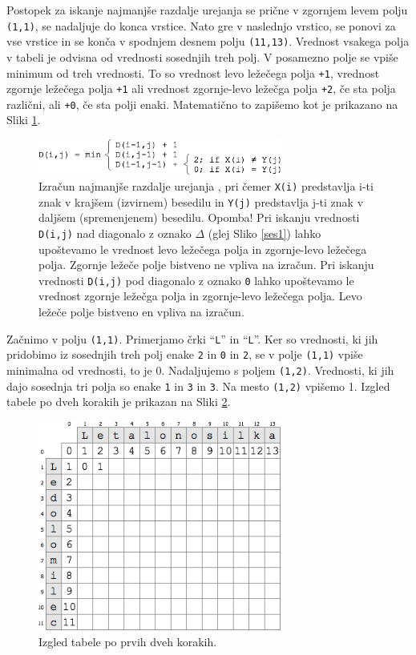 \documentclass[a4paper, 12pt, twoside]{book}
\begin{document}
Postopek za iskanje najmanjše razdalje urejanja se prične v zgornjem levem polju {\tt (1,1)}, se nadaljuje do konca vrstice. Nato gre v naslednjo vrstico, se ponovi za vse vrstice in se konča v spodnjem desnem polju {\tt (11,13)}. Vrednost vsakega polja v tabeli je odvisna od vrednosti sosednjih treh polj. V posamezno polje se vpiše minimum od treh vrednosti. To so vrednost levo ležečega polja {\tt +1}, vrednost zgornje ležečega polja {\tt +1} ali vrednost zgornje-levo ležečga polja {\tt +2}, če sta polja različni, ali {\tt +0}, če sta polji enaki. Matematično to zapišemo kot je prikazano na Sliki \ref{med2}.

\begin{figure}[placement h]
\begin{center}
\includegraphics[width=8cm]{med2.png}
\end{center}
\caption{Izračun najmanjše razdalje urejanja \cite{med}, pri čemer {\tt X(i)} predstavlja i-ti znak v krajšem (izvirnem) besedilu in {\tt Y(j)} predstavlja j-ti znak v daljšem (spremenjenem) besedilu. Opomba! Pri iskanju vrednosti {\tt D(i,j)} nad diagonalo z oznako {\tt $\Delta$} (glej Sliko \ref{ses1}) lahko upoštevamo le vrednost levo ležečega polja in zgornje-levo ležečega polja. Zgornje ležeče polje bistveno ne vpliva na izračun. Pri iskanju vrednosti {\tt D(i,j)} pod diagonalo z oznako {\tt 0} lahko upoštevamo le vrednost zgornje ležečga polja in zgornje-levo ležečega polja. Levo ležeče polje bistveno en vpliva na izračun.}
\label{med2}
\end{figure}

\pagebreak

Začnimo v polju {\tt (1,1)}. Primerjamo črki “{\tt L}” in “{\tt L}”. Ker so vrednosti, ki jih pridobimo iz sosednjih treh polj enake {\tt 2} in {\tt 0} in {\tt 2}, se v polje {\tt (1,1)} vpiše minimalna od vrednosti, to je 0. Nadaljujemo s poljem {\tt (1,2)}. Vrednosti, ki jih dajo sosednja tri polja so enake {\tt 1} in {\tt 3} in {\tt 3}. Na mesto {\tt (1,2)} vpišemo 1. Izgled tabele po dveh korakih je prikazan na Sliki \ref{med3}.

\begin{figure}[placement h]
\begin{center}
\includegraphics[width=8cm]{med3.png}
\end{center}
\caption{Izgled tabele po prvih dveh korakih.}
\label{med3}
\end{figure}
\end{document}
